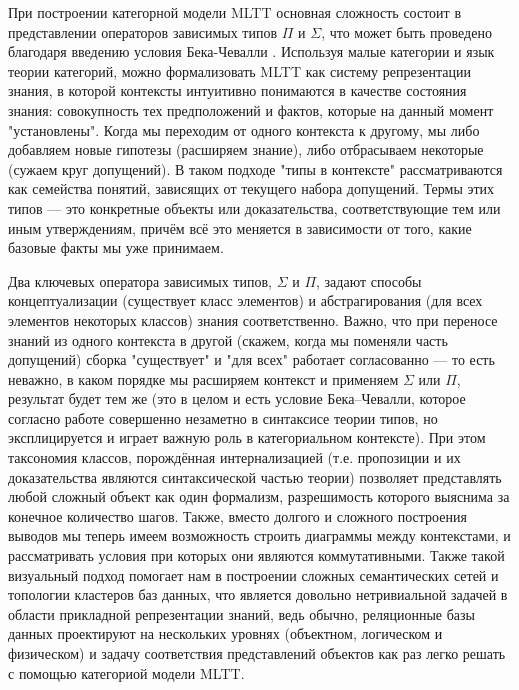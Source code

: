 \documentclass[14pt]{extarticle}
\begin{document}
	При построении категорной модели MLTT основная сложность состоит в представлении операторов зависимых типов \(\Pi \text{ и } \Sigma\), что может быть проведено благодаря введению условия Бека-Чевалли \cite[§14]{Pavlovic1991}. Используя малые категории и язык теории категорий, можно формализовать MLTT как систему репрезентации знания, в которой контексты интуитивно понимаются в качестве состояния знания: совокупность тех предположений и фактов, которые на данный момент "установлены". Когда мы переходим от одного контекста к другому, мы либо добавляем новые гипотезы (расширяем знание), либо отбрасываем некоторые (сужаем круг допущений).	
	В таком подходе "типы в контексте" рассматриваются как семейства понятий, зависящих от текущего набора допущений. Термы этих типов — это конкретные объекты или доказательства, соответствующие тем или иным утверждениям, причём всё это меняется в зависимости от того, какие базовые факты мы уже принимаем.
	
	Два ключевых оператора зависимых типов, $\Sigma$ и $\Pi$, задают способы концептуализации (существует класс элементов) и абстрагирования (для всех элементов некоторых классов) знания соответственно. Важно, что при переносе знаний из одного контекста в другой (скажем, когда мы поменяли часть допущений) сборка "существует" и "для всех" работает согласованно — то есть неважно, в каком порядке мы расширяем контекст и применяем $\Sigma$ или $\Pi$, результат будет тем же (это в целом и есть условие Бека–Чевалли, которое согласно работе \cite{Lamarche2014} совершенно незаметно в синтаксисе теории типов, но эксплицируется и играет важную роль в категориальном контексте).
	При этом таксономия классов, порождённая интернализацией (т.е. пропозиции и их доказательства являются синтаксической частью теории) позволяет представлять любой сложный объект как один формализм, разрешимость которого выяснима за конечное количество шагов. Также, вместо долгого и сложного построения выводов мы теперь имеем возможность строить диаграммы между контекстами, и рассматривать условия при которых они являются коммутативными. Также такой визуальный подход помогает нам в построении сложных семантических сетей и топологии кластеров баз данных, что является довольно нетривиальной задачей в области прикладной репрезентации знаний, ведь обычно, реляционные базы данных проектируют на нескольких уровнях (объектном, логическом и физическом) и задачу соответствия представлений объектов как раз легко решать с помощью категориой модели MLTT.
	
	\newpage
		
\end{document}
